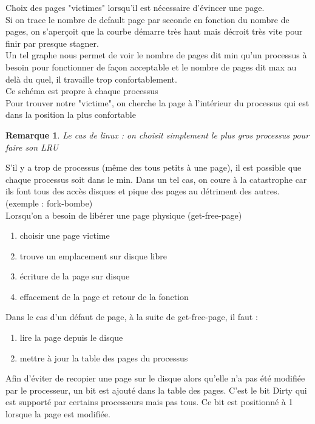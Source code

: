 \documentclass[12pt,a4paper]{report}
\newtheorem*{rem}{Remarque}
\begin{document}
Choix des pages "victimes" lorsqu'il est nécessaire d'évincer une page.\\
Si on trace le nombre de default page par seconde en fonction du nombre de pages, on s'aperçoit que la courbe démarre très haut mais décroit très vite pour finir par presque stagner.\\
Un tel graphe nous permet de voir le nombre de pages dit min qu'un processus à besoin pour fonctionner de façon acceptable et le nombre de pages dit max au delà du quel, il travaille trop confortablement.\\
Ce schéma est propre à chaque processus\\
Pour trouver notre "victime", on cherche la page à l'intérieur du processus qui est dans la position la plus confortable\\
\begin{rem}
Le cas de linux : on choisit simplement le plus gros processus pour faire son LRU \end{rem}

S'il y a trop de processus (même des tous petits à une page), il est possible que chaque processus soit dans le min. Dans un tel cas, on coure à la catastrophe car ils font tous des accès disques et pique des pages au détriment des autres. (exemple : fork-bombe)\\

Lorsqu'on a besoin de libérer une page physique (get-free-page)
\begin{enumerate}
\item choisir une page victime
\item trouve un emplacement sur disque libre
\item écriture de la page sur disque
\item effacement de la page et retour de la fonction\\
\end{enumerate}

Dans le cas d'un défaut de page, à la suite de get-free-page, il faut :
\begin{enumerate}
\item lire la page depuis le disque
\item mettre à jour la table des pages du processus\\
\end{enumerate}

Afin d'éviter de recopier une page sur le disque alors qu'elle n'a pas été modifiée par le processeur, un bit est ajouté dans la table des pages. C'est le bit Dirty qui est supporté par certains processeurs mais pas tous. Ce bit est positionné à 1 lorsque la page est modifiée.\\
\end{document}
